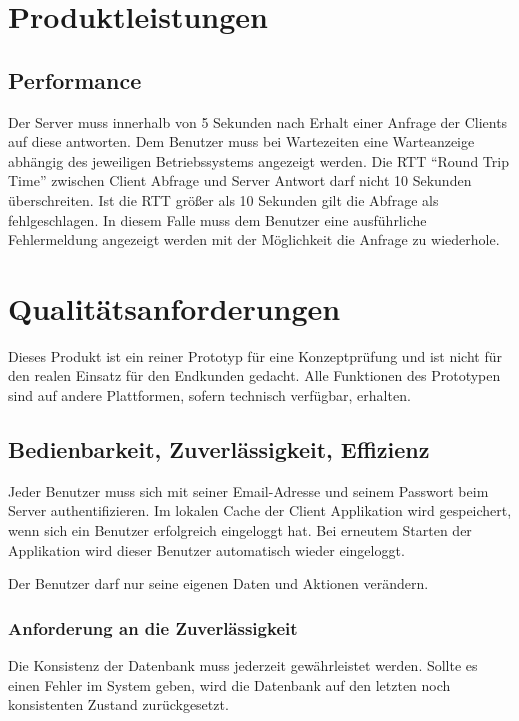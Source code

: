 \documentclass[a4paper,12pt,oneside]{scrartcl}
\begin{document}
\section{Produktleistungen}
\hypertarget{s07}{\subsection{Performance}}
Der Server muss innerhalb von 5 Sekunden nach Erhalt einer Anfrage der Clients auf diese antworten.
Dem Benutzer muss bei Wartezeiten eine Warteanzeige abhängig des jeweiligen Betriebssystems angezeigt werden. 
Die RTT "`Round Trip Time"' zwischen Client Abfrage und Server Antwort darf nicht 10 Sekunden überschreiten.
Ist die RTT größer als 10 Sekunden gilt die Abfrage als fehlgeschlagen.
In diesem Falle muss dem Benutzer eine ausführliche Fehlermeldung angezeigt werden mit der Möglichkeit die Anfrage zu wiederhole. 




\section{Qualitätsanforderungen}
Dieses Produkt ist ein reiner Prototyp für eine Konzeptprüfung und ist nicht für den realen Einsatz für den Endkunden gedacht.
Alle Funktionen des Prototypen sind auf andere Plattformen, sofern technisch verfügbar, erhalten.


\subsection{Bedienbarkeit, Zuverlässigkeit, Effizienz}
Jeder Benutzer muss sich mit seiner Email-Adresse und seinem Passwort beim Server authentifizieren. 
Im lokalen Cache der Client Applikation wird gespeichert, wenn sich ein Benutzer erfolgreich eingeloggt hat. 
Bei erneutem Starten der Applikation wird dieser Benutzer automatisch wieder eingeloggt. 

Der Benutzer darf nur seine eigenen Daten und Aktionen verändern.



\subsubsection{Anforderung an die Zuverlässigkeit}
Die Konsistenz der Datenbank muss jederzeit gewährleistet werden.
Sollte es einen Fehler im System geben, wird die Datenbank auf den letzten noch konsistenten Zustand zurückgesetzt.
\end{document}
